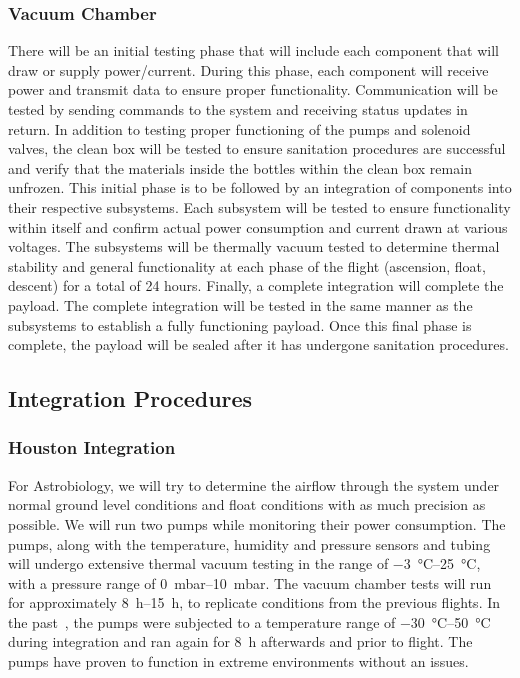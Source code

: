 \subsubsection{Vacuum Chamber}
There will be an initial testing phase that will include each component that will draw or supply power/current. During this phase, each component will receive power and transmit data to ensure proper functionality. Communication will be tested by sending commands to the system and receiving status updates in return. In addition to testing proper functioning of the pumps and solenoid valves, the clean box will be tested to ensure sanitation procedures are successful and verify that the materials inside the bottles within the clean box remain unfrozen. This initial phase is to be followed by an integration of components into their respective subsystems. Each subsystem will be tested to ensure functionality within itself and confirm actual power consumption and current drawn at various voltages. The subsystems will be thermally vacuum tested to determine thermal stability and general functionality at each phase of the flight (ascension, float, descent) for a total of 24 hours. Finally, a complete integration will complete the payload. The complete integration will be tested in the same manner as the subsystems to establish a fully functioning payload. Once this final phase is complete, the payload will be sealed after it has undergone sanitation procedures.

\subsection{Integration Procedures}
\subsubsection{Houston Integration}
For Astrobiology, we will try to determine the airflow through the system under normal ground level conditions and float conditions with as much precision as possible.  We will run two pumps while monitoring their power consumption. The pumps, along with the temperature, humidity and pressure sensors and tubing will undergo extensive thermal vacuum testing in the range of \SIrange{-3}{25}{\celsius}, with a pressure range of \SIrange{0}{10}{\milli\bar}. The vacuum chamber tests will run for approximately \SIrange{8}{15}{\hour}, to replicate conditions from the previous flights. In the past~\cite{SORA}, the pumps were subjected to a temperature range of \SIrange{-30}{50}{\celsius} during integration and ran again for \SI{8}{\hour} afterwards and prior to flight. The pumps have proven to function in extreme environments without an issues. 

